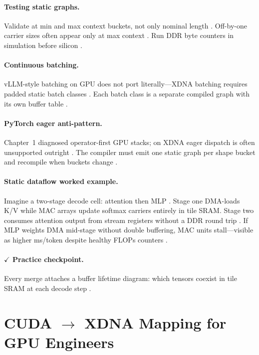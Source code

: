 \paragraph{Testing static graphs.}
Validate at min and max context buckets, not only nominal length \citep{dao2023flashdecoding,amd2024aie}.
Off-by-one carrier sizes often appear only at max context \citep{memoryfloor2026}.
Run DDR byte counters in simulation before silicon \citep{amd2024xdna}.

\paragraph{Continuous batching.}
vLLM-style batching on GPU does not port literally---XDNA batching requires padded static batch classes \citep{kwon2023vllm,amd2024xdna,yirage2026}.
Each batch class is a separate compiled graph with its own buffer table \citep{patel2025llminference}.

\paragraph{PyTorch eager anti-pattern.}
Chapter~1 diagnosed operator-first GPU stacks; on XDNA eager dispatch is often unsupported outright \citep{taxbreak2026,amd2024xdna}.
The compiler must emit one static graph per shape bucket and recompile when buckets change \citep{yirage2026,patel2025llminference}.

\paragraph{Static dataflow worked example.}
Imagine a two-stage decode cell: attention then MLP \citep{dao2022flashattention}.
Stage one DMA-loads K/V while MAC arrays update softmax carriers entirely in tile SRAM.
Stage two consumes attention output from stream registers without a DDR round trip \citep{amd2024aie,semianalysis2024tma}.
If MLP weights DMA mid-stage without double buffering, MAC units stall---visible as higher ms/token despite healthy FLOPs counters \citep{patel2025llminference,memoryfloor2026}.

\paragraph{$\checkmark$ Practice checkpoint.}
Every merge attaches a buffer lifetime diagram: which tensors coexist in tile SRAM at each decode step \citep{amd2024aie,yirage2026}.

\section{CUDA $\rightarrow$ XDNA Mapping for GPU Engineers}
\label{sec:ch05_cuda_xdna_mapping}

